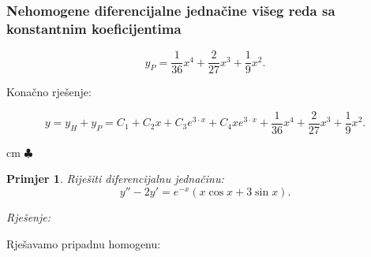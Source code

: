 \documentclass{beamer}
\newtheorem{pri}{\textrm{Primjer}}[section]
\begin{document}
\begin{frame}
\frametitle{Nehomogene diferencijalne jednačine višeg reda sa konstantnim koeficijentima}
$$y_{P} = \frac{1}{36} x^{4} + \frac{2}{27}x^{3} + \frac{1}{9}x^{2}.$$

Konačno rješenje:

$$y = y_{H} + y_{P} = C_{1} + C_{2}x + C_{3}e^{3 \cdot x} + C_{4}xe^{3\cdot x} + \frac{1}{36} x^{4} + \frac{2}{27}x^{3} + \frac{1}{9}x^{2}.$$

  cm $\clubsuit$ \\
 
 \begin{pri}
 Riješiti diferencijalnu jednačinu:
$$y'' - 2y' = e^{-x}(x\cos{x} + 3 \sin{x}).$$
 \end{pri}

\emph{Rješenje: }

Rješavamo pripadnu homogenu:





\end{frame}
\end{document}
